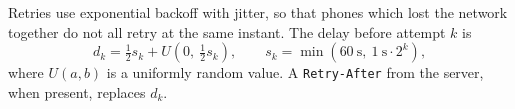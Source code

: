 Retries use exponential backoff with jitter, so that phones which lost the network together do not all retry at the same instant. The delay before attempt $k$ is
\begin{equation}\label{eq:backoff}
  d_k = \tfrac{1}{2}s_k + U\!\left(0,\ \tfrac{1}{2}s_k\right), \qquad s_k = \min\!\left(60\ \text{s},\ 1\ \text{s}\cdot 2^{k}\right),
\end{equation}
where $U(a,b)$ is a uniformly random value. A \texttt{Retry-After} from the server, when present, replaces $d_k$.
